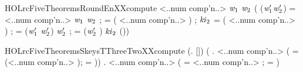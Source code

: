 \begin{SaveVerbatim}{HOLrcFiveTheoremsRoundEnXXcompute}
      <..num comp'n..> \ensuremath{\HOLBoundVar{w}\sb{\mathrm{1}}} \ensuremath{\HOLBoundVar{w}\sb{\mathrm{2}}}  \HOLSymConst{=}
     (
        (\ensuremath{\HOLBoundVar{w}\sb{\mathrm{1}}\sp{\prime{}}}\HOLSymConst{,}\ensuremath{\HOLBoundVar{w}\sb{\mathrm{2}}\sp{\prime{}}}) =  <..num comp'n..> \ensuremath{\HOLBoundVar{w}\sb{\mathrm{1}}} \ensuremath{\HOLBoundVar{w}\sb{\mathrm{2}}} ;
         =  ( \HOLSymConst{\HOLTokenProd{}} <..num comp'n..> ) ;
        \ensuremath{\HOLBoundVar{ki}\sb{\mathrm{2}}} =  ( \HOLSymConst{\HOLTokenProd{}} <..num comp'n..> \HOLSymConst{\ensuremath{+}} ) ;
         = (\ensuremath{\HOLBoundVar{w}\sb{\mathrm{1}}\sp{\prime{}}} \HOLSymConst{\HOLTokenEor{}} \ensuremath{\HOLBoundVar{w}\sb{\mathrm{2}}\sp{\prime{}}}) \HOLSymConst{\HOLTokenRol{}}  \ensuremath{\HOLBoundVar{w}\sb{\mathrm{2}}\sp{\prime{}}} \HOLSymConst{\ensuremath{+}} ;
         = (\ensuremath{\HOLBoundVar{w}\sb{\mathrm{2}}\sp{\prime{}}} \HOLSymConst{\HOLTokenEor{}} ) \HOLSymConst{\HOLTokenRol{}}   \HOLSymConst{\ensuremath{+}} \ensuremath{\HOLBoundVar{ki}\sb{\mathrm{2}}}
        (\HOLSymConst{,}))
\end{SaveVerbatim}
\newcommand{\HOLrcFiveTheoremsRoundEnXXcompute}{\UseVerbatim{HOLrcFiveTheoremsRoundEnXXcompute}}
\begin{SaveVerbatim}{HOLrcFiveTheoremsSkeysTThreeTwoXXcompute}
\HOLTokenTurnstile{} (\HOLSymConst{\HOLTokenForall{}}.    \HOLSymConst{=} []) \HOLSymConst{\HOLTokenConj{}}
   (\HOLSymConst{\HOLTokenForall{}} .
        <..num comp'n..> \HOLSymConst{=}
      (
          =   (<..num comp'n..> \HOLSymConst{\ensuremath{-}} );
          =  
          \HOLSymConst{\ensuremath{+}} \HOLSymConst{::})) \HOLSymConst{\HOLTokenConj{}}
   \HOLSymConst{\HOLTokenForall{}} .
       <..num comp'n..> \HOLSymConst{=}
     (
         =   <..num comp'n..> ;
         =  
         \HOLSymConst{\ensuremath{+}} \HOLSymConst{::})
\end{SaveVerbatim}
